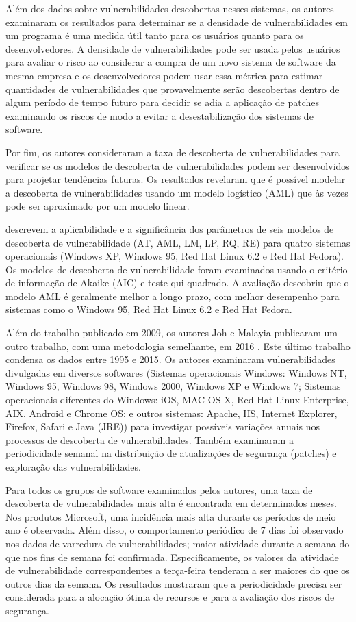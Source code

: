 Além dos dados sobre vulnerabilidades descobertas nesses sistemas, os autores examinaram os resultados para determinar se a densidade de vulnerabilidades em um programa é uma medida útil tanto para os usuários quanto para os desenvolvedores. A densidade de vulnerabilidades pode ser usada pelos usuários para avaliar o risco ao considerar a compra de um novo sistema de software da mesma empresa e os desenvolvedores podem usar essa métrica para estimar quantidades de vulnerabilidades que provavelmente serão descobertas dentro de algum período de tempo futuro para decidir se adia a aplicação de patches examinando os riscos de modo a evitar a desestabilização dos sistemas de software.

Por fim, os autores consideraram a taxa de descoberta de vulnerabilidades para verificar se os modelos de descoberta de vulnerabilidades podem ser desenvolvidos para projetar tendências futuras. Os resultados revelaram que é possível modelar a descoberta de vulnerabilidades usando um modelo logístico (AML) que às vezes pode ser aproximado por um modelo linear.

 descrevem a aplicabilidade e a significância dos parâmetros de seis modelos de descoberta de vulnerabilidade (AT, AML, LM, LP, RQ, RE) para quatro sistemas operacionais (Windows XP, Windows 95, Red Hat Linux 6.2 e Red Hat Fedora). Os modelos de descoberta de vulnerabilidade foram examinados usando o critério de informação de Akaike (AIC) e teste qui-quadrado. A avaliação descobriu que o modelo AML é geralmente melhor a longo prazo, com melhor desempenho para sistemas como o Windows 95, Red Hat Linux 6.2 e Red Hat Fedora. 

Além do trabalho publicado em 2009, os autores Joh e Malayia publicaram um outro trabalho, com uma metodologia semelhante, em 2016 \cite{Joh2016}. Este último trabalho condensa os dados entre 1995 e 2015. Os autores examinaram vulnerabilidades divulgadas em diversos softwares (Sistemas operacionais Windows: Windows NT, Windows 95, Windows 98, Windows 2000, Windows XP e Windows 7; Sistemas operacionais diferentes do Windows: iOS, MAC OS X, Red Hat Linux Enterprise, AIX, Android e Chrome OS; e outros sistemas: Apache, IIS, Internet Explorer, Firefox, Safari e Java (JRE)) para investigar possíveis variações anuais nos processos de descoberta de vulnerabilidades. Também examinaram a periodicidade semanal na distribuição de atualizações de segurança (patches) e exploração das vulnerabilidades. 

Para todos os grupos de software examinados pelos autores, uma taxa de descoberta de vulnerabilidades mais alta é encontrada em determinados meses. Nos produtos Microsoft, uma incidência mais alta durante os períodos de meio ano é observada. Além disso, o comportamento periódico de 7 dias foi observado nos dados de varredura de vulnerabilidades; maior atividade durante a semana  do que nos fins de semana foi confirmada. Especificamente, os valores da atividade de vulnerabilidade correspondentes a terça-feira tenderam a ser maiores do que os outros dias da semana. Os resultados mostraram que a periodicidade precisa ser considerada para a alocação ótima de recursos e para a avaliação dos riscos de segurança.

